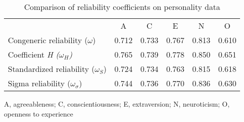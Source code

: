 \begin{table}[ht]
\centering
\caption{Comparison of reliability coefficients on personality data} 
\label{tab:reliabilites}
\begin{tabular}{lccccc}
  & A & C & E & N & O \\ 
 Congeneric reliability ($\omega$) & 0.712 & 0.733 & 0.767 & 0.813 & 0.610 \\ 
  Coefficient \it{H} ($\omega_H$) & 0.765 & 0.739 & 0.778 & 0.850 & 0.651 \\ 
  Standardized reliability ($\omega_S$) & 0.724 & 0.734 & 0.763 & 0.815 & 0.618 \\ 
  Sigma reliability ($\omega_\sigma$) & 0.744 & 0.736 & 0.770 & 0.836 & 0.630 \\ 
  \end{tabular}
  \vskip7.0pt
A, agreeableness; C, conscientiousness; E, extraversion; N, neuroticism; O, openness to experience 
\end{table}
